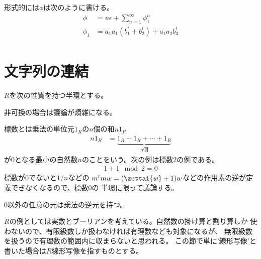 	形式的には$\phi$は次のように書ける。
	\begin{equation*}\begin{split} %
		\phi &= u\epsilon + \sum_{n=1}^\infty \phi_1^n \\
		\phi_1 &= a_1a_1(b_1^t + b_2^t) + a_1a_2b_3^t \\
	\end{split}\end{equation*} %
\endgroup %
\begingroup %
	\newcommand{\Word}[1]{\ensuremath{\mathcal{W}{#1}}}
	\newcommand{\wordu}[1]{\ensuremath{1_{\Word{#1}}}}
	\newcommand{\word}[1]{\ensuremath{[{#1}]}}
	\newcommand{\wordg}[1]{\ensuremath{\bigl[{#1}\bigr]}}
	\newcommand{\wordgg}[1]{\ensuremath{\biggl[{#1}\biggr]}}
	\newcommand{\mydef}{\ensuremath{\overset{\mathrm{def}}{=}}}
	\newcommand{\lin}[1]{\ensuremath{\myop{lin}{#1}}}
	\newcommand{\push}[1]{\ensuremath{\myop{push}{#1}}}
	\newcommand{\pop}[1]{\ensuremath{\myop{pop}{#1}}}
	\newcommand{\lfnc}[2]{\ensuremath{\lambda_{#1}{#2}}}
	\newcommand{\moji}[1]{\ensuremath{\myop{\mathbf{#1}}}}
	\newcommand{\myid}{\myop{id}}
\section{文字列の連結}\label{s1:文字列の連結} %
	$R$を次の性質を持つ半環とする。
	\begin{description}\setlength{\itemsep}{-1mm} %
		\item[可換] 非可換の場合は議論が煩雑になる。
		\item[標数が$0$] 標数とは乗法の単位元$1_R$の$n$個の和$n1_R$
		\begin{equation*}\begin{split} %
			n1_R &= \underbrace{1_R+1_R+\cdots+1_R}_{n\text{個}}
		\end{split}\end{equation*} %
		が$0$となる最小の自然数$n$のことをいう。次の例は標数$2$の例である。
		\begin{equation*}\begin{split} %
			1 + 1 \mod 2 = 0
		\end{split}\end{equation*} %
		標数が$0$でないと$1/n$などの
		$m^tmw=(\zettai{w}+1)w$などの作用素の逆が定義できなくなるので、標数$0$の
		半環に限って議論する。
		\item[割り算を持つ] $0$以外の任意の元は乗法の逆元を持つ。
	\end{description} %
	$R$の例としては実数とブーリアンを考えている。自然数の掛け算と割り算しか
	使わないので、有限級数しか扱わなければ有理数なども対象になるが、
	無限級数を扱うので有理数の範囲内に収まらないと思われる。
	この節で単に'線形写像'と書いた場合は$R$線形写像を指すものとする。

